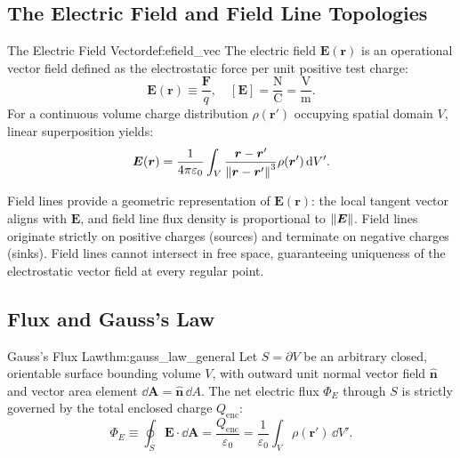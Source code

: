 \subsection[The Electric Field and Field Line Topologies]{The Electric Field and Field Line Topologies}

\begin{definition}{The Electric Field Vector}{def:efield_vec}
The electric field $\bm{E}(\bm{r})$ is an operational vector field defined as the electrostatic force per unit positive test charge:
\begin{equation}
    \bm{E}(\bm{r}) \equiv \frac{\bm{F}}{q}, \quad [\bm{E}] = \frac{\text{N}}{\text{C}} = \frac{\text{V}}{\text{m}}.
\end{equation}
For a continuous volume charge distribution $\rho(\bm{r}')$ occupying spatial domain $V$, linear superposition yields:
\begin{equation}
    \bm{E}(\bm{r}) = \frac{1}{4\pi\varepsilon_0} \int_V \frac{\bm{r} - \bm{r}'}{\norm{\bm{r} - \bm{r}'}^3} \rho(\bm{r}') \, \dd V'.
\end{equation}
\end{definition}

\begin{remark}
Field lines provide a geometric representation of $\bm{E}(\bm{r})$: the local tangent vector aligns with $\bm{E}$, and field line flux density is proportional to $\norm{\bm{E}}$. Field lines originate strictly on positive charges (sources) and terminate on negative charges (sinks). Field lines cannot intersect in free space, guaranteeing uniqueness of the electrostatic vector field at every regular point.
\end{remark}

\subsection[Flux and Gauss's Law]{Flux and Gauss's Law}

\begin{theorem}{Gauss's Flux Law}{thm:gauss_law_general}
Let $S = \partial V$ be an arbitrary closed, orientable surface bounding volume $V$, with outward unit normal vector field $\hat{\bm{n}}$ and vector area element $\dd\bm{A} = \hat{\bm{n}}\,\dd A$. The net electric flux $\Phi_E$ through $S$ is strictly governed by the total enclosed charge $Q_{\text{enc}}$:
\begin{equation}
    \Phi_E \equiv \oint_S \bm{E} \cdot \dd\bm{A} = \frac{Q_{\text{enc}}}{\varepsilon_0} = \frac{1}{\varepsilon_0} \int_V \rho(\bm{r}') \, \dd V'.
\end{equation}
\end{theorem}

